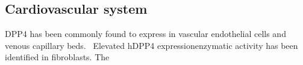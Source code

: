 \subsection{Cardiovascular system}
DPP4 has been commonly found to express in vascular endothelial cells and venous capillary beds.~\cite{Matheeussen2013,Shigeta2012} Elevated hDPP4 expressionenzymatic activity has been identified in fibroblasts. The  